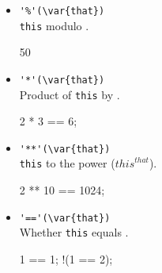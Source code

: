 \begin{itemize}
\item \lstinline|'%'(\var{that})|\\
  \lstinline|this| modulo .
\begin{urbiassert}[firstnumber=last]
50 %
\end{urbiassert}

\item \lstinline|'*'(\var{that})|\\
  Product of \lstinline|this| by .
\begin{urbiassert}[firstnumber=last]
2 * 3 == 6;
\end{urbiassert}

\item \lstinline|'**'(\var{that})|\\
  \lstinline|this| to the  power (${this}^{that}$).
\begin{urbiassert}[firstnumber=last]
2 ** 10 == 1024;
\end{urbiassert}

\item \lstinline|'=='(\var{that})|\\
  Whether \lstinline|this| equals .
\begin{urbiassert}[firstnumber=last]
  1 == 1;
!(1 == 2);
\end{urbiassert}
\end{itemize}


